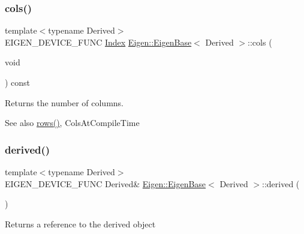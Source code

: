 \subsubsection{\texorpdfstring{cols()}{cols()}}
{\footnotesize\ttfamily template$<$typename Derived$>$ \\
E\+I\+G\+E\+N\+\_\+\+D\+E\+V\+I\+C\+E\+\_\+\+F\+U\+NC \mbox{\hyperlink{struct_eigen_1_1_eigen_base_a554f30542cc2316add4b1ea0a492ff02}{Index}} \mbox{\hyperlink{struct_eigen_1_1_eigen_base}{Eigen\+::\+Eigen\+Base}}$<$ Derived $>$\+::cols (\begin{DoxyParamCaption}\item[{void}]{ }\end{DoxyParamCaption}) const\hspace{0.3cm}{\ttfamily [inline]}}

\begin{DoxyReturn}{Returns}
the number of columns. 
\end{DoxyReturn}
\begin{DoxySeeAlso}{See also}
\mbox{\hyperlink{struct_eigen_1_1_eigen_base_a8141320ba8df384426c298b32b000d8e}{rows()}}, Cols\+At\+Compile\+Time 
\end{DoxySeeAlso}
\mbox{\label{struct_eigen_1_1_eigen_base_a324b16961a11d2ecfd2d1b7dd7946545}} 
\subsubsection{\texorpdfstring{derived()}{derived()}\hspace{0.1cm}{\footnotesize\ttfamily [1/2]}}
{\footnotesize\ttfamily template$<$typename Derived$>$ \\
E\+I\+G\+E\+N\+\_\+\+D\+E\+V\+I\+C\+E\+\_\+\+F\+U\+NC Derived\& \mbox{\hyperlink{struct_eigen_1_1_eigen_base}{Eigen\+::\+Eigen\+Base}}$<$ Derived $>$\+::derived (\begin{DoxyParamCaption}{ }\end{DoxyParamCaption})\hspace{0.3cm}{\ttfamily [inline]}}

\begin{DoxyReturn}{Returns}
a reference to the derived object 
\end{DoxyReturn}
\mbox{\label{struct_eigen_1_1_eigen_base_ad0cbee5e2dfef3bbe9db5e6d5fe12cc0}} 
